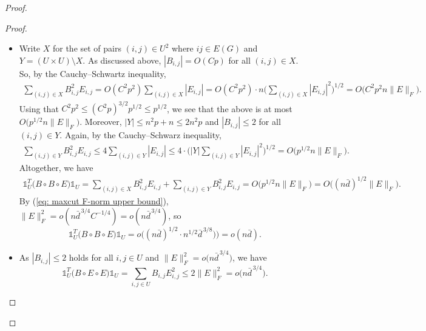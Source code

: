 \documentclass[11pt]{article}
\theoremstyle{plain}
\theoremstyle{definition}
\begin{document}
\begin{proof}
\begin{proof}
\begin{itemize}
        \item[(1)] Write $X$ for the set of pairs $(i,j) \in U^2$ where $ij \in E(G)$ and $Y=(U\times U)\setminus X$. As discussed above, $|B_{i,j}| = O(Cp)$ for all $(i,j) \in X$.
        So, by the Cauchy--Schwartz inequality, 
        \begin{equation} \nonumber
          \begin{aligned}
            \sum_{(i,j) \in X} B_{i,j}^2E_{i,j}
            = O(C^2p^2) \sum_{(i,j) \in X}|E_{i,j}|
            = O(C^2p^2) \cdot n \Big(\sum_{(i,j) \in X}|E_{i,j}|^2\Big)^{1/2} 
            = O\big(C^2p^2n \|E\|_F \big).
          \end{aligned}
        \end{equation}
        Using that  $C^2p^2\le (C^2p)^{3/2}p^{1/2}\le p^{1/2}$, we see that the above is at most $O\big(p^{1/2}n \|E\|_F \big)$.
        Moreover, $|Y| \le n^2p+n \le 2n^2p$ and $|B_{i,j}| \le 2$ for all $(i,j) \in Y$.
        Again, by the Cauchy--Schwarz inequality, 
        \begin{equation} \nonumber
          \begin{aligned}
            \sum_{(i,j) \in Y} B_{i,j}^2E_{i,j}
            \le 4 \sum_{(i,j) \in Y}|E_{i,j}|
            \le 4 \cdot \Big(|Y|\sum_{(i,j) \in Y}|E_{i,j}|^2\Big)^{1/2} 
            = O\big(p^{1/2}n \|E\|_F\big).
          \end{aligned}
        \end{equation}
        Altogether, we have 
        \begin{equation} \nonumber
          \begin{aligned}
            \mathds{1}_U^T\big(B\circ B\circ E\big)\mathds{1}_U
            = \sum_{(i,j) \in X} B_{i,j}^2E_{i,j} + \sum_{(i,j) \in Y} B_{i,j}^2E_{i,j}
            = O\big(p^{1/2}n\|E\|_F\big)
            = O\big((n\bar{d})^{1/2} \|E\|_F\big).
          \end{aligned}
        \end{equation}
        By (\ref{eq: maxcut F-norm upper bound}), $\|E\|_F^2 = o(n\bar{d}^{\,3/4}C^{-1/4})=o(n\bar{d}^{\,3/4})$, so $$
            \mathds{1}_U^T\big(B\circ B\circ E\big)\mathds{1}_U
            = o\big( (n\bar{d})^{1/2} \cdot n^{1/2}\bar{d}^{\,3/8})\big)
            = o(n\bar{d}).
        $$
        
        \item[(2)] As $|B_{i,j}| \le 2$ holds for all $i,j \in U$ and $\|E\|_F^2 = o\big(n\bar{d}^{\,3/4}\big)$, we have
        \begin{equation} \nonumber
            \mathds{1}_U^T\big(B\circ E\circ E\big)\mathds{1}_U 
            = \sum_{i,j \in U} B_{i,j} E_{i,j}^2
            \le 2 \|E\|_F^2 
            = o\big(n\bar{d}^{\,3/4} \big).
        \end{equation}
        

\end{itemize}
\end{proof}
\end{proof}
\end{document}
